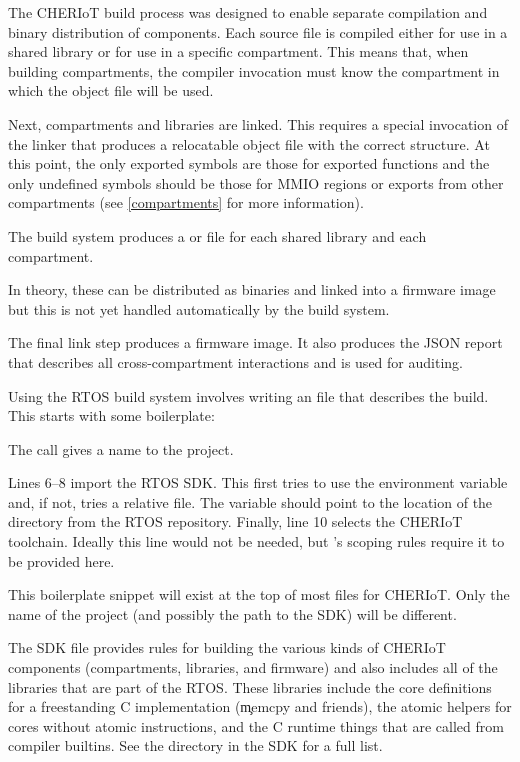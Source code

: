 The CHERIoT build process was designed to enable separate compilation and binary distribution of components.
Each source file is compiled either for use in a shared library or for use in a specific compartment.
This means that, when building compartments, the compiler invocation must know the compartment in which the object file will be used.

Next, compartments and libraries are linked.
This requires a special invocation of the linker that produces a relocatable object file with the correct structure.
At this point, the only exported symbols are those for exported functions and the only undefined symbols should be those for MMIO regions or exports from other compartments (see \ref{compartments} for more information).

\begin{note}
	The build system produces a  or  file for each shared library and each compartment.
\end{note}

In theory, these can be distributed as binaries and linked into a firmware image but this is not yet handled automatically by the build system.

The final link step produces a firmware image.
It also produces the JSON report that describes all cross-compartment interactions and is used for auditing.

Using the RTOS build system involves writing an  file that describes the build.
This starts with some boilerplate:

\lualisting[filename=examples/hello_world/xmake.lua,marker=boilerplate,label=lst:xmakeboilerplate,caption="Build system code for importing the CHERIoT RTOS SDK"]{}

The  call gives a name to the project.

Lines 6–8 import the RTOS SDK.
This first tries to use the  environment variable and, if not, tries a relative file.
The  variable should point to the location of the  directory from the RTOS repository.
Finally, line 10 selects the CHERIoT toolchain.
Ideally this line would not be needed, but 's scoping rules require it to be provided here.

This boilerplate snippet will exist at the top of most  files for CHERIoT.
Only the name of the project (and possibly the path to the SDK) will be different.

The SDK file provides rules for building the various kinds of CHERIoT components (compartments, libraries, and firmware) and also includes all of the libraries that are part of the RTOS.
These libraries include the core definitions for a freestanding C implementation (\c{memcpy} and friends), the atomic helpers for cores without atomic instructions, and the C runtime things that are called from compiler builtins.
See the  directory in the SDK for a full list.


